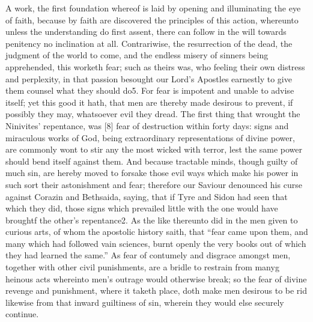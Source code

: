 A work, the first foundation whereof is laid by opening and illuminating the eye of faith, because by faith are discovered the principles of this action, whereunto unless the understanding do first assent, there can follow in the will towards penitency no inclination at all. Contrariwise, the resurrection of the dead, the judgment of the world to come, and the endless misery of sinners being apprehended, this worketh fear; such as theirs was, who feeling their own distress and perplexity, in that passion besought our Lord’s Apostles earnestly to give them counsel what they should do5. For fear is impotent and unable to advise itself; yet this good it hath, that men are thereby made desirous to prevent, if possibly they may, whatsoever evil they dread. The first thing that wrought the Ninivites’ repentance, was [8] fear of destruction within forty days: signs and miraculous works of God, being extraordinary representations of divine power, are commonly wont to stir any the most wicked with terror, lest the same power should bend itself against them. And because tractable minds, though guilty of much sin, are hereby moved to forsake those evil ways which make his power in such sort their astonishment and fear; therefore our Saviour denounced his curse against Corazin and Bethsaida, saying, that if Tyre and Sidon had seen that which they did, those signs which prevailed little with the one would have broughtf the other’s repentance2. As the like thereunto did in the men given to curious arts, of whom the apostolic history saith, that “fear came upon them, and many which had followed vain sciences, burnt openly the very books out of which they had learned the same.” As fear of contumely and disgrace amongst men, together with other civil punishments, are a bridle to restrain from manyg heinous acts whereinto men’s outrage would otherwise break; so the fear of divine revenge and punishment, where it taketh place, doth make men desirous to be rid likewise from that inward guiltiness of sin, wherein they would else securely continue.

